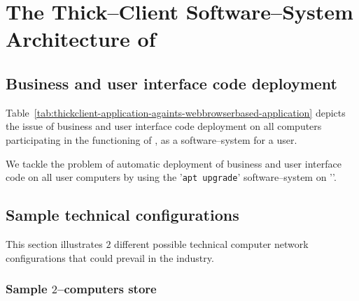 \chapter{The Thick--Client Software--System Architecture of \yerotherpblack}

\vspace{-1em}


\vspace{1em}

\section{Business and user interface code deployment}

Table~\ref{tab:thickclient-application-againts-webbrowserbased-application}
depicts the issue of business and user
interface code deployment on all computers
participating in the functioning of \yerotherpblack,
as a software--system for a user.

We tackle the problem of automatic deployment of
business and user interface code on all user
computers by using the '\texttt{apt upgrade}'
software--system on '\debianlinux'.


\section{Sample technical configurations}

This section illustrates $2$ different possible
technical computer network configurations that
could prevail in the industry. 

\newpage

\subsection{Sample $2$--computers store}

